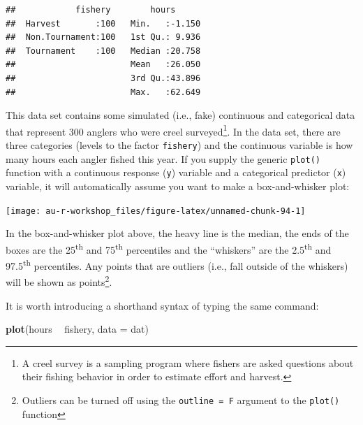 \documentclass[]{book}
\newenvironment{Shaded}{\begin{snugshade}}{\end{snugshade}}
\newcommand{\DataTypeTok}[1]{\textcolor[rgb]{0.13,0.29,0.53}{#1}}
\newcommand{\KeywordTok}[1]{\textcolor[rgb]{0.13,0.29,0.53}{\textbf{#1}}}
\newcommand{\NormalTok}[1]{#1}
\newcommand{\OperatorTok}[1]{\textcolor[rgb]{0.81,0.36,0.00}{\textbf{#1}}}
\newcommand{\StringTok}[1]{\textcolor[rgb]{0.31,0.60,0.02}{#1}}
\let\rmarkdownfootnote\footnote%
\def\footnote{\protect\rmarkdownfootnote}
\begin{document}
\begin{verbatim}
##            fishery        hours       
##  Harvest       :100   Min.   :-1.150  
##  Non.Tournament:100   1st Qu.: 9.936  
##  Tournament    :100   Median :20.758  
##                       Mean   :26.050  
##                       3rd Qu.:43.896  
##                       Max.   :62.649
\end{verbatim}

This data set contains some simulated (i.e., fake) continuous and categorical data that represent 300 anglers who were creel surveyed\footnote{A creel survey is a sampling program where fishers are asked questions about their fishing behavior in order to estimate effort and harvest.}. In the data set, there are three categories (levels to the factor \texttt{fishery}) and the continuous variable is how many hours each angler fished this year. If you supply the generic \texttt{plot()} function with a continuous response (\texttt{y}) variable and a categorical predictor (\texttt{x}) variable, it will automatically assume you want to make a box-and-whisker plot:

\begin{Shaded}
\end{Shaded}

\begin{center}\texttt{[image: au-r-workshop\_files/figure-latex/unnamed-chunk-94-1]} \end{center}

In the box-and-whisker plot above, the heavy line is the median, the ends of the boxes are the 25\textsuperscript{th} and 75\textsuperscript{th} percentiles and the ``whiskers'' are the 2.5\textsuperscript{th} and 97.5\textsuperscript{th} percentiles. Any points that are outliers (i.e., fall outside of the whiskers) will be shown as points\footnote{Outliers can be turned off using the \texttt{outline\ =\ F} argument to the \texttt{plot()} function}.

It is worth introducing a shorthand syntax of typing the same command:

\begin{Shaded}
\begin{Highlighting}[]
\KeywordTok{plot}\NormalTok{(hours }\OperatorTok{~}\StringTok{ }\NormalTok{fishery, }\DataTypeTok{data =}\NormalTok{ dat)}
\end{Highlighting}
\end{Shaded}
\end{document}
